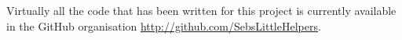 Virtually all the code that has been written for this project is currently
available in the GitHub organisation \url{http://github.com/SebsLittleHelpers}.
